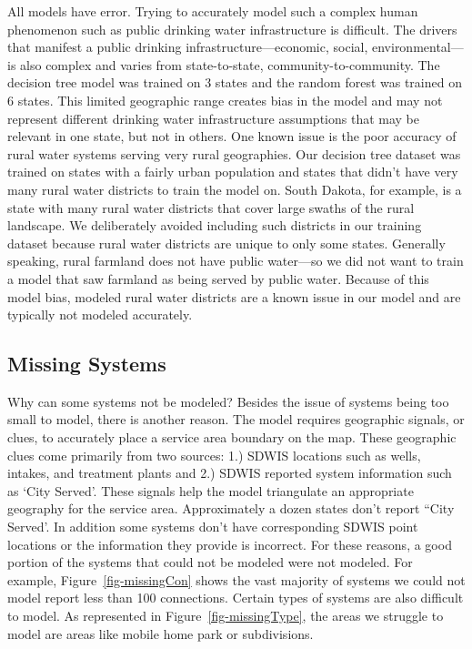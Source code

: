 \documentclass[12pt]{article}
\begin{document}
All models have error. Trying to accurately model such a complex human
phenomenon such as public drinking water infrastructure is difficult.
The drivers that manifest a public drinking infrastructure---economic,
social, environmental---is also complex and varies from state-to-state,
community-to-community. The decision tree model was trained on 3 states
and the random forest was trained on 6 states. This limited geographic
range creates bias in the model and may not represent different drinking
water infrastructure assumptions that may be relevant in one state, but
not in others. One known issue is the poor accuracy of rural water
systems serving very rural geographies. Our decision tree dataset was
trained on states with a fairly urban population and states that didn't
have very many rural water districts to train the model on. South
Dakota, for example, is a state with many rural water districts that
cover large swaths of the rural landscape. We deliberately avoided
including such districts in our training dataset because rural water
districts are unique to only some states. Generally speaking, rural
farmland does not have public water---so we did not want to train a
model that saw farmland as being served by public water. Because of this
model bias, modeled rural water districts are a known issue in our model
and are typically not modeled accurately.

\subsection{Missing Systems}\label{missing-systems}

Why can some systems not be modeled? Besides the issue of systems being
too small to model, there is another reason. The model requires
geographic signals, or clues, to accurately place a service area
boundary on the map. These geographic clues come primarily from two
sources: 1.) SDWIS locations such as wells, intakes, and treatment
plants and 2.) SDWIS reported system information such as `City Served'.
These signals help the model triangulate an appropriate geography for
the service area. Approximately a dozen states don't report ``City
Served'. In addition some systems don't have corresponding SDWIS point
locations or the information they provide is incorrect. For these
reasons, a good portion of the systems that could not be modeled were
not modeled. For example, Figure~\ref{fig-missingCon} shows the vast
majority of systems we could not model report less than 100 connections.
Certain types of systems are also difficult to model. As represented in
Figure~\ref{fig-missingType}, the areas we struggle to model are areas
like mobile home park or subdivisions.
\end{document}
